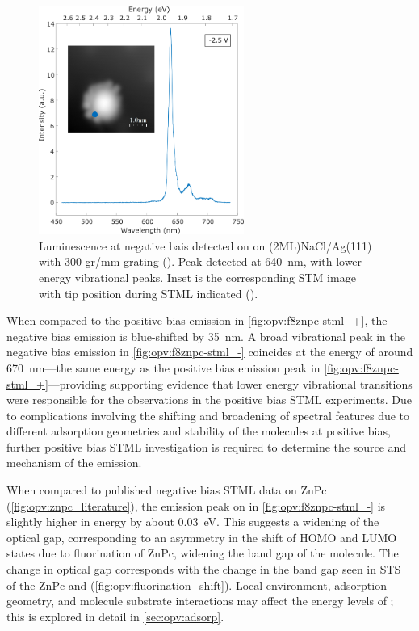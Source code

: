 \begin{figure} [H]
    \centering
           \includegraphics[width=0.6\textwidth]{pictures/f8znpc_-ve_emission_inset300.png}
        \caption{Luminescence at negative bais detected on  on (2ML)NaCl/Ag(111) with 300 gr/mm grating (). Peak detected at \SI{640}{nm}, with lower energy vibrational peaks. Inset is the corresponding STM image with tip position during STML indicated ().}
        \label{fig:opv:f8znpc-stml_-}
\end{figure}

When compared to the positive bias emission in \autoref{fig:opv:f8znpc-stml_+}, the negative bias emission is blue-shifted by \SI{35}{nm}. A broad vibrational peak in the negative bias emission in \autoref{fig:opv:f8znpc-stml_-} coincides at the energy of around \SI{670}{nm}---the same energy as the positive bias emission peak in \autoref{fig:opv:f8znpc-stml_+}---providing supporting evidence that lower energy vibrational transitions were responsible for the observations in the positive bias \ac{STML} experiments.  Due to complications involving the shifting and broadening of spectral features due to different adsorption geometries and stability of the molecules at positive bias, further positive bias \ac{STML} investigation is required to determine the source and mechanism of the emission.

When compared to published negative bias \ac{STML} data on \ac{ZnPc} (\autoref{fig:opv:znpc_literature}), the emission peak on  in \autoref{fig:opv:f8znpc-stml_-} is slightly higher in energy by about \SI{0.03}{eV}. This suggests a widening of the optical gap, corresponding to an asymmetry in the shift of HOMO and LUMO states due to fluorination of ZnPc, widening the band gap of the molecule. The change in optical gap corresponds with the change in the band gap seen in \ac{STS} of the ZnPc and  (\autoref{fig:opv:fluorination_shift}).  Local environment, adsorption geometry, and molecule substrate interactions may affect the energy levels of ; this is explored in detail in \autoref{sec:opv:adsorp}.

